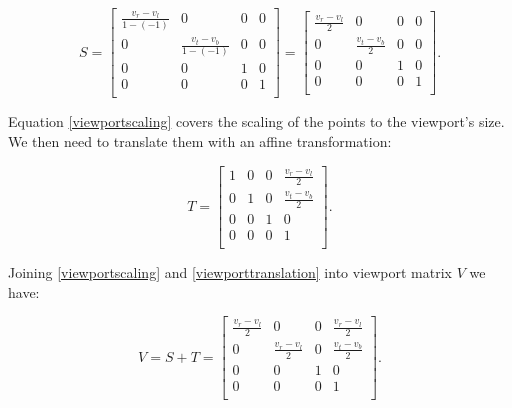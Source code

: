 \documentclass[cic,tc,english]{iiufrgs}
\begin{document}
\begin{equation}
    S=
    \begin{bmatrix}
        \frac{v_r-v_l}{1 - (-1)} & 0 & 0 & 0  \\
        0 & \frac{v_t-v_b}{1 - (-1)} & 0 & 0  \\
        0 & 0 & 1 & 0                         \\
        0 & 0 & 0 & 1                         \\
    \end{bmatrix}
    =
    \begin{bmatrix}
        \frac{v_r-v_l}{2} & 0 & 0 & 0  \\
        0 & \frac{v_t-v_b}{2} & 0 & 0  \\
        0 & 0 & 1 & 0                  \\
        0 & 0 & 0 & 1                  \\
    \end{bmatrix}
    \label{viewportscaling}
    .
\end{equation}



Equation \ref{viewportscaling} covers the scaling of the points to the viewport's size. We then need to translate them with an affine transformation:

 \begin{equation}
    T=
    \begin{bmatrix}
        1 & 0 & 0 & \frac{v_r-v_l}{2}  \\
        0 & 1 & 0 & \frac{v_t-v_b}{2}  \\
        0 & 0 & 1 & 0                  \\
        0 & 0 & 0 & 1                  \\
    \end{bmatrix}
    \label{viewporttranslation}
    .
\end{equation}

Joining \cref{viewportscaling} and \cref{viewporttranslation} into viewport matrix $V$ we have:

 \begin{equation}
    V=S + T=
    \begin{bmatrix}
        \frac{v_r-v_l}{2} & 0 & 0 & \frac{v_r-v_l}{2} \\
        0 & \frac{v_r-v_l}{2} & 0 & \frac{v_t-v_b}{2} \\
        0 & 0 & 1 & 0                                 \\
        0 & 0 & 0 & 1                                 \\
    \end{bmatrix}
    .
\end{equation}
\end{document}
